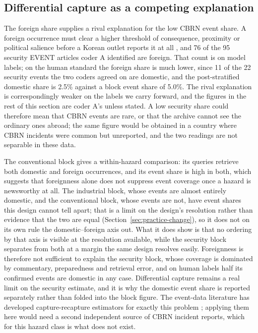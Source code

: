 \documentclass[1p,times]{elsarticle}
\begin{document}
\subsection{Differential capture as a competing explanation}
\label{sec:capture}
The foreign share supplies a rival explanation for the low CBRN event share. A foreign occurrence must clear a higher threshold of consequence, proximity or political salience before a Korean outlet reports it at all \cite{galtung1965,vanbelle2000,yan2015,zhu2018}, and 76 of the 95 security EVENT articles coder A identified are foreign. That count is on model labels; on the human standard the foreign share is much lower, since 11 of the 22 security events the two coders agreed on are domestic, and the post-stratified domestic share is 2.5\% against a block event share of 5.0\%. The rival explanation is correspondingly weaker on the labels we carry forward, and the figures in the rest of this section are coder A's unless stated. A low security share could therefore mean that CBRN events are rare, or that the archive cannot see the ordinary ones abroad; the same figure would be obtained in a country where CBRN incidents were common but unreported, and the two readings are not separable in these data.

The conventional block gives a within-hazard comparison: its queries retrieve both domestic and foreign occurrences, and its event share is high in both, which suggests that foreignness alone does not suppress event coverage once a hazard is newsworthy at all. The industrial block, whose events are almost entirely domestic, and the conventional block, whose events are not, have event shares this design cannot tell apart; that is a limit on the design's resolution rather than evidence that the two are equal (Section~\ref{sec:practice-change}), so it does not on its own rule the domestic--foreign axis out. What it does show is that no ordering by that axis is visible at the resolution available, while the security block separates from both at a margin the same design resolves easily. Foreignness is therefore not sufficient to explain the security block, whose coverage is dominated by commentary, preparedness and retrieval error, and on human labels half its confirmed events are domestic in any case. Differential capture remains a real limit on the security estimate, and it is why the domestic event share is reported separately rather than folded into the block figure. The event-data literature has developed capture-recapture estimators for exactly this problem \cite{hendrix2015,weidmann2016,weidmann2014,dietrich2020}; applying them here would need a second independent source of CBRN incident reports, which for this hazard class is what does not exist.
\end{document}
